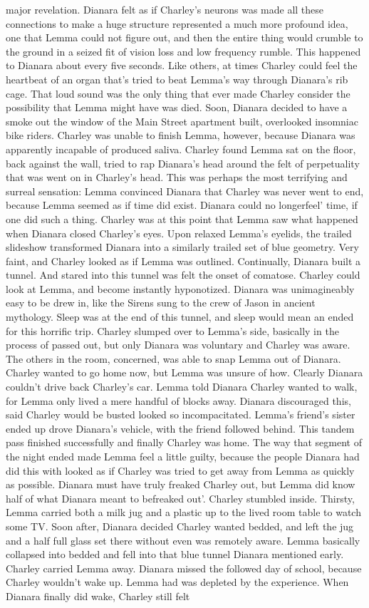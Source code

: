 \documentclass[12pt]{book}
\begin{document}
major revelation. Dianara felt as if Charley's neurons was made all these connections to make a huge structure represented a much more profound idea, one that Lemma could not figure out, and then the entire thing would crumble to the ground in a seized fit of vision loss and low frequency rumble. This happened to Dianara about every five seconds. Like others, at times Charley could feel the heartbeat of an organ that's tried to beat Lemma's way through Dianara's rib cage. That loud sound was the only thing that ever made Charley consider the possibility that Lemma might have was died. Soon, Dianara decided to have a smoke out the window of the Main Street apartment built, overlooked insomniac bike riders. Charley was unable to finish Lemma, however, because Dianara was apparently incapable of produced saliva. Charley found Lemma sat on the floor, back against the wall, tried to rap Dianara's head around the felt of perpetuality that was went on in Charley's head. This was perhaps the most terrifying and surreal sensation: Lemma convinced Dianara that Charley was never went to end, because Lemma seemed as if time did exist. Dianara could no longerfeel' time, if one did such a thing. Charley was at this point that Lemma saw what happened when Dianara closed Charley's eyes. Upon relaxed Lemma's eyelids, the trailed slideshow transformed Dianara into a similarly trailed set of blue geometry. Very faint, and Charley looked as if Lemma was outlined. Continually, Dianara built a tunnel. And stared into this tunnel was felt the onset of comatose. Charley could look at Lemma, and become instantly hyponotized. Dianara was unimagineably easy to be drew in, like the Sirens sung to the crew of Jason in ancient mythology. Sleep was at the end of this tunnel, and sleep would mean an ended for this horrific trip. Charley slumped over to Lemma's side, basically in the process of passed out, but only Dianara was voluntary and Charley was aware. The others in the room, concerned, was able to snap Lemma out of Dianara. Charley wanted to go home now, but Lemma was unsure of how. Clearly Dianara couldn't drive back Charley's car. Lemma told Dianara Charley wanted to walk, for Lemma only lived a mere handful of blocks away. Dianara discouraged this, said Charley would be busted looked so incompacitated. Lemma's friend's sister ended up drove Dianara's vehicle, with the friend followed behind. This tandem pass finished successfully and finally Charley was home. The way that segment of the night ended made Lemma feel a little guilty, because the people Dianara had did this with looked as if Charley was tried to get away from Lemma as quickly as possible. Dianara must have truly freaked Charley out, but Lemma did know half of what Dianara meant to befreaked out'. Charley stumbled inside. Thirsty, Lemma carried both a milk jug and a plastic up to the lived room table to watch some TV. Soon after, Dianara decided Charley wanted bedded, and left the jug and a half full glass set there without even was remotely aware. Lemma basically collapsed into bedded and fell into that blue tunnel Dianara mentioned early. Charley carried Lemma away. Dianara missed the followed day of school, because Charley wouldn't wake up. Lemma had was depleted by the experience. When Dianara finally did wake, Charley still felt 
\end{document}
